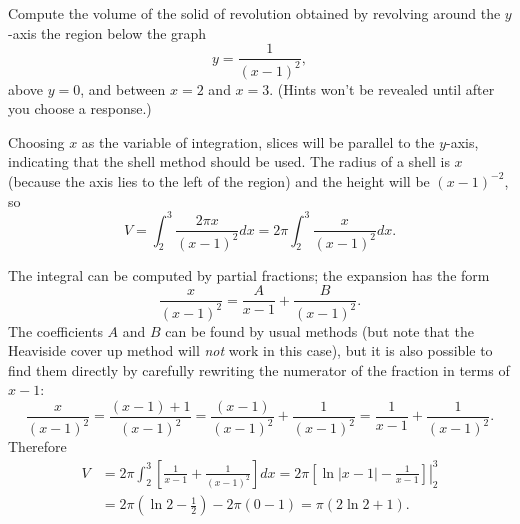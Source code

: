 \documentclass{ximera}
\begin{document}
\begin{question}%
Compute the volume of the solid of revolution obtained by revolving around the $y$-axis the region below the graph
\[ y = \frac{1}{(x-1)^2}, \]
above $y=0$, and between $x=2$ and $x=3$.
(Hints won't be revealed until after you choose a response.)
\begin{multiplechoice}
\choice{\(\displaystyle \pi\)}
\end{multiplechoice}
\begin{feedback}
Choosing $x$ as the variable of integration, slices will be parallel to the $y$-axis, indicating that the shell method should be used. The radius of a shell is $x$ (because the axis lies to the left of the region) and the height will be $(x-1)^{-2}$, so 
\[ V = \int_2^3 \frac{2 \pi x}{(x-1)^2} dx = 2 \pi \int_2^3 \frac{x}{(x-1)^2} dx. \] \begin{hint}
The integral can be computed by partial fractions; the expansion has the form
\[ \frac{x}{(x-1)^2} = \frac{A}{x-1} + \frac{B}{(x-1)^2}. \]
The coefficients $A$ and $B$ can be found by usual methods (but note that the Heaviside cover up method will \textit{not} work in this case), but it is also possible to find them directly by carefully rewriting the numerator of the fraction in terms of $x-1$:
\[ \frac{x}{(x-1)^2} = \frac{(x-1) + 1}{(x-1)^2} = \frac{(x-1)}{(x-1)^2} + \frac{1}{(x-1)^2} = \frac{1}{x-1} + \frac{1}{(x-1)^2}. \]
Therefore
\[ \begin{aligned} V & = 2 \pi \int_2^3 \left[ \frac{1}{x-1} + \frac{1}{(x-1)^2} \right] dx = 2 \pi \left. \left[ \ln |x-1| - \frac{1}{x-1} \right] \right|_{2}^3 \\
& = 2 \pi \left( \ln 2 - \frac{1}{2} \right) - 2 \pi \left( 0 - 1 \right) = \pi(2 \ln 2 + 1). \end{aligned}\] \end{hint}
\end{feedback}

\end{question}
\end{document}
